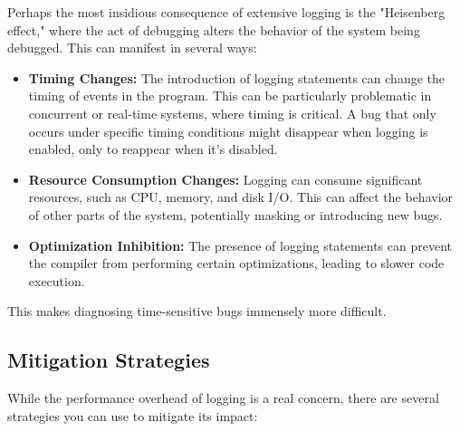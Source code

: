 \documentclass{article}
\begin{document}
{{{{Perhaps the most insidious consequence of extensive logging is the "Heisenberg effect," where the act of debugging alters the behavior of the system being debugged. This can manifest in several ways:

\begin{itemize}
    \item \textbf{Timing Changes:} The introduction of logging statements can change the timing of events in the program. This can be particularly problematic in concurrent or real-time systems, where timing is critical. A bug that only occurs under specific timing conditions might disappear when logging is enabled, only to reappear when it's disabled.
    \item \textbf{Resource Consumption Changes:} Logging can consume significant resources, such as CPU, memory, and disk I/O. This can affect the behavior of other parts of the system, potentially masking or introducing new bugs.
    \item \textbf{Optimization Inhibition:} The presence of logging statements can prevent the compiler from performing certain optimizations, leading to slower code execution.
\end{itemize}

This makes diagnosing time-sensitive bugs immensely more difficult.

\subsection*{Mitigation Strategies}

While the performance overhead of logging is a real concern, there are several strategies you can use to mitigate its impact:

}}}}
\end{document}
